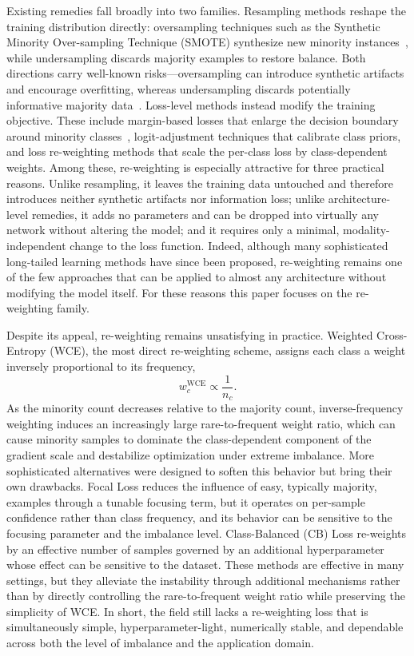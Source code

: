 \documentclass[a4paper,fleqn]{cas-sc}
\begin{document}
Existing remedies fall broadly into two families. Resampling methods reshape the
training distribution directly: oversampling techniques such as the Synthetic
Minority Over-sampling Technique (SMOTE) synthesize new minority
instances~\citep{chawla2002}, while undersampling discards majority examples to
restore balance. Both directions carry well-known risks---oversampling can
introduce synthetic artifacts and encourage overfitting, whereas undersampling
discards potentially informative majority data~\citep{drummond2003}. Loss-level
methods instead modify the training objective. These include margin-based losses
that enlarge the decision boundary around minority
classes~\citep{cao2019}, logit-adjustment techniques that calibrate class priors,
and loss re-weighting methods that scale the per-class loss by class-dependent
weights. Among these, re-weighting is especially attractive for three practical
reasons. Unlike resampling, it leaves the training data untouched and therefore
introduces neither synthetic artifacts nor information loss; unlike
architecture-level remedies, it adds no parameters and can be dropped into
virtually any network without altering the model; and it requires only a minimal,
modality-independent change to the loss function. Indeed, although many
sophisticated long-tailed learning methods have since been proposed, re-weighting
remains one of the few approaches that can be applied to almost any architecture
without modifying the model itself. For these reasons this paper focuses on the
re-weighting family.

Despite its appeal, re-weighting remains unsatisfying in practice. Weighted
Cross-Entropy (WCE), the most direct re-weighting scheme, assigns each class a
weight inversely proportional to its frequency,
\begin{equation}
w_c^{\mathrm{WCE}} \propto \frac{1}{n_c}.
\end{equation}
As the minority count decreases relative to the majority count, inverse-frequency
weighting induces an increasingly large rare-to-frequent weight ratio, which can
cause minority samples to dominate the class-dependent component of the gradient
scale and destabilize optimization under extreme imbalance. More sophisticated
alternatives were designed to soften this behavior but bring their own drawbacks.
Focal Loss reduces the influence of easy, typically majority, examples through a
tunable focusing term, but it operates on per-sample confidence rather than class
frequency, and its behavior can be sensitive to the focusing parameter and the
imbalance level. Class-Balanced (CB) Loss re-weights by an effective number of
samples governed by an additional hyperparameter whose effect can be sensitive to
the dataset. These methods are effective in many settings, but they alleviate the
instability through additional mechanisms rather than by directly controlling the
rare-to-frequent weight ratio while preserving the simplicity of WCE. In short, the
field still lacks a re-weighting loss that is simultaneously simple,
hyperparameter-light, numerically stable, and dependable across both the level of
imbalance and the application domain.
\end{document}

